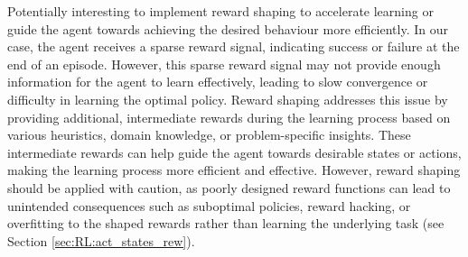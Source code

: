 Potentially interesting to implement reward shaping to accelerate learning or guide the agent towards achieving the desired behaviour more efficiently. In our case, the agent receives a sparse reward signal, indicating success or failure at the end of an episode. However, this sparse reward signal may not provide enough information for the agent to learn effectively, leading to slow convergence or difficulty in learning the optimal policy. Reward shaping addresses this issue by providing additional, intermediate rewards during the learning process based on various heuristics, domain knowledge, or problem-specific insights. These intermediate rewards can help guide the agent towards desirable states or actions, making the learning process more efficient and effective. However, reward shaping should be applied with caution, as poorly designed reward functions can lead to unintended consequences such as suboptimal policies, reward hacking, or overfitting to the shaped rewards rather than learning the underlying task (see Section \ref{sec:RL:act_states_rew}).